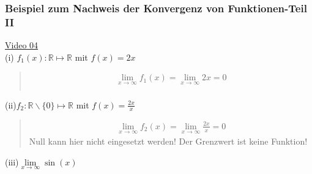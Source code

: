 \subsubsection{Beispiel zum Nachweis der Konvergenz von Funktionen-Teil II}
\href{https://youtu.be/in86heC1gIQ}{Video 04}\\
(i)\;\; $ f_1(x):\mathbb{R}\longmapsto \mathbb{R} $ mit $ f(x)=2x $\\
\begin{quote}
	\begin{align*}
	\lim\limits_ {x\to\infty} f_1(x)=\lim\limits_ {x\to\infty}2x=0\\
	\end{align*}
\end{quote}
(ii)\;\;$ f_2:\mathbb{R}\backslash\{0\}\longmapsto\mathbb{R} $ mit $ f(x) =\frac{2x}{x}$\\
\begin{quote}
	\begin{align*}
	\lim\limits_ {x\to\infty}f_2(x)=\lim\limits_ {x\to\infty}\frac{2x}{x}=0
	\end{align*}
	Null kann hier nicht eingesetzt werden! Der Grenzwert ist keine Funktion!\\
\end{quote}
(iii)\;\;$ \lim\limits_ {x\to\infty}\sin(x) $\\
